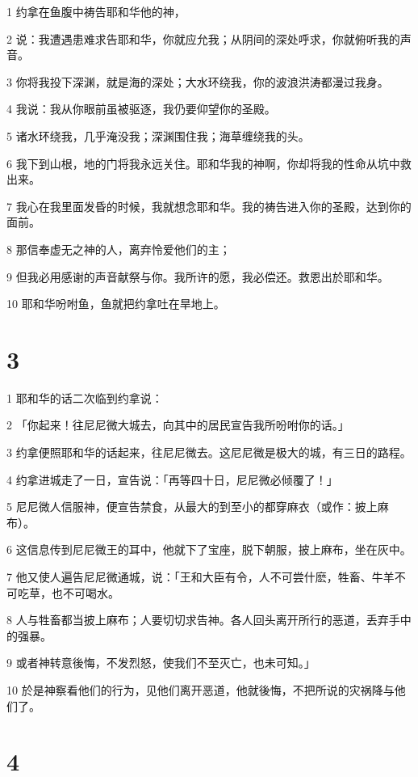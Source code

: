 \par 1 约拿在鱼腹中祷告耶和华他的神，
\par 2 说：我遭遇患难求告耶和华，你就应允我；从阴间的深处呼求，你就俯听我的声音。
\par 3 你将我投下深渊，就是海的深处；大水环绕我，你的波浪洪涛都漫过我身。
\par 4 我说：我从你眼前虽被驱逐，我仍要仰望你的圣殿。
\par 5 诸水环绕我，几乎淹没我；深渊围住我；海草缠绕我的头。
\par 6 我下到山根，地的门将我永远关住。耶和华我的神啊，你却将我的性命从坑中救出来。
\par 7 我心在我里面发昏的时候，我就想念耶和华。我的祷告进入你的圣殿，达到你的面前。
\par 8 那信奉虚无之神的人，离弃怜爱他们的主；
\par 9 但我必用感谢的声音献祭与你。我所许的愿，我必偿还。救恩出於耶和华。
\par 10 耶和华吩咐鱼，鱼就把约拿吐在旱地上。

\chapter{3}

\par 1 耶和华的话二次临到约拿说：
\par 2 「你起来！往尼尼微大城去，向其中的居民宣告我所吩咐你的话。」
\par 3 约拿便照耶和华的话起来，往尼尼微去。这尼尼微是极大的城，有三日的路程。
\par 4 约拿进城走了一日，宣告说：「再等四十日，尼尼微必倾覆了！」
\par 5 尼尼微人信服神，便宣告禁食，从最大的到至小的都穿麻衣（或作：披上麻布）。
\par 6 这信息传到尼尼微王的耳中，他就下了宝座，脱下朝服，披上麻布，坐在灰中。
\par 7 他又使人遍告尼尼微通城，说：「王和大臣有令，人不可尝什麽，牲畜、牛羊不可吃草，也不可喝水。
\par 8 人与牲畜都当披上麻布；人要切切求告神。各人回头离开所行的恶道，丢弃手中的强暴。
\par 9 或者神转意後悔，不发烈怒，使我们不至灭亡，也未可知。」
\par 10 於是神察看他们的行为，见他们离开恶道，他就後悔，不把所说的灾祸降与他们了。

\chapter{4}


